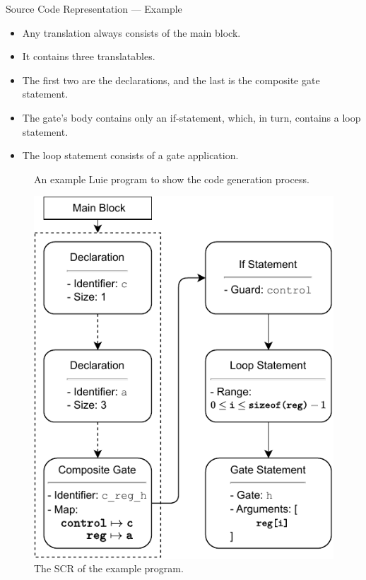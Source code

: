 \begin{frame}{Source Code Representation --- Example}
    \begin{minipage}{.60\textwidth}
        \begin{itemize}
            \item Any translation always consists of the main block.
            \item It contains three translatables.
            \item The first two are the declarations, and the last is the composite gate statement.
            \item The gate's body contains only an if-statement, which, in turn, contains a loop statement.
            \item The loop statement consists of a gate application. 
        \end{itemize}   
        \vfill
        \begin{figure}
            \centering
            
            \caption{An example Luie program to show the code generation process.}
        \end{figure} 
    \end{minipage}
    \begin{minipage}{.35\textwidth}
        \centering
        \begin{figure}[htp]
            \centering
            \includegraphics[]{../figures/drawio/codeGen_sourceCode_example.pdf}
            \caption{The SCR of the example program.}
        \end{figure}
    \end{minipage}
\end{frame}

